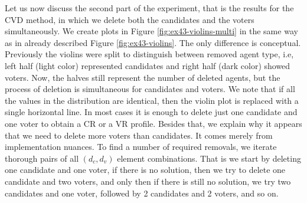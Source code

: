 Let us now discuss the second part of the experiment, that is the results for the CVD method,
in which we delete both the candidates and the voters simultaneously.
We create plots in Figure \ref{fig:ex43-violins-multi} in the same way as in already described Figure \ref{fig:ex43-violins}.
The only difference is conceptual.
Previously the violins were split to distinguish between removed agent type,
i.e, left half (light color) represented candidates and right half (dark color) showed voters.
Now, the halves still represent the number of deleted agents, but the process of deletion is simultaneous for candidates and voters.
We note that if all the values in the distribution are identical, then the violin plot is replaced with a single horizontal line.
In most cases it is enough to delete just one candidate and one voter to obtain a CR or a VR profile.
Besides that, we explain why it appears that we need to delete more voters than candidates.
It comes merely from implementation nuances. To find a number of required removals,
we iterate thorough pairs of all $(d_c, d_v)$ element combinations.
That is we start by deleting one candidate and one voter, if there is no solution, then we try to delete one candidate and two voters,
and only then if there is still no solution, we try two candidates and one voter, followed by 2 candidates and 2 voters, and so on.



